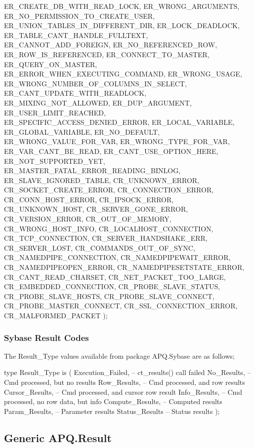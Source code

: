 \documentclass[english,letterpaper]{book}
\begin{document}
\begin{Code}
   ER_CREATE_DB_WITH_READ_LOCK,
   ER_WRONG_ARGUMENTS,
   ER_NO_PERMISSION_TO_CREATE_USER,
   ER_UNION_TABLES_IN_DIFFERENT_DIR,
   ER_LOCK_DEADLOCK,
   ER_TABLE_CANT_HANDLE_FULLTEXT,
   ER_CANNOT_ADD_FOREIGN,
   ER_NO_REFERENCED_ROW,
   ER_ROW_IS_REFERENCED,
   ER_CONNECT_TO_MASTER,
   ER_QUERY_ON_MASTER,
   ER_ERROR_WHEN_EXECUTING_COMMAND,
   ER_WRONG_USAGE,
   ER_WRONG_NUMBER_OF_COLUMNS_IN_SELECT,
   ER_CANT_UPDATE_WITH_READLOCK,
   ER_MIXING_NOT_ALLOWED,
   ER_DUP_ARGUMENT,
   ER_USER_LIMIT_REACHED,
   ER_SPECIFIC_ACCESS_DENIED_ERROR,
   ER_LOCAL_VARIABLE,
   ER_GLOBAL_VARIABLE,
   ER_NO_DEFAULT,
   ER_WRONG_VALUE_FOR_VAR,
   ER_WRONG_TYPE_FOR_VAR,
   ER_VAR_CANT_BE_READ,
   ER_CANT_USE_OPTION_HERE,
   ER_NOT_SUPPORTED_YET,
   ER_MASTER_FATAL_ERROR_READING_BINLOG,
   ER_SLAVE_IGNORED_TABLE,
   CR_UNKNOWN_ERROR,
   CR_SOCKET_CREATE_ERROR,
   CR_CONNECTION_ERROR,
   CR_CONN_HOST_ERROR,
   CR_IPSOCK_ERROR,
   CR_UNKNOWN_HOST,
   CR_SERVER_GONE_ERROR,
   CR_VERSION_ERROR,
   CR_OUT_OF_MEMORY,
   CR_WRONG_HOST_INFO,
   CR_LOCALHOST_CONNECTION,
   CR_TCP_CONNECTION,
   CR_SERVER_HANDSHAKE_ERR,
   CR_SERVER_LOST,
   CR_COMMANDS_OUT_OF_SYNC,
   CR_NAMEDPIPE_CONNECTION,
   CR_NAMEDPIPEWAIT_ERROR,
   CR_NAMEDPIPEOPEN_ERROR,
   CR_NAMEDPIPESETSTATE_ERROR,
   CR_CANT_READ_CHARSET,
   CR_NET_PACKET_TOO_LARGE,
   CR_EMBEDDED_CONNECTION,
   CR_PROBE_SLAVE_STATUS,
   CR_PROBE_SLAVE_HOSTS,
   CR_PROBE_SLAVE_CONNECT,
   CR_PROBE_MASTER_CONNECT,
   CR_SSL_CONNECTION_ERROR,
   CR_MALFORMED_PACKET
);
\end{Code}

\subsubsection{Sybase Result Codes}

The Result\_Type values available from package APQ.Sybase are as follows;

\begin{Code}
type Result_Type is (
   Execution_Failed, -- ct_results() call failed
   No_Results,       -- Cmd processed, but no results
   Row_Results,      -- Cmd processed, and row results
   Cursor_Results,   -- Cmd processed, and cursor row result
   Info_Results,     -- Cmd processed, no row data, but info
   Compute_Results,  -- Computed results
   Param_Results,    -- Parameter results
   Status_Results    -- Status results
);
\end{Code}

\subsection{Generic APQ.Result\label{Generic APQ.Result}}
\end{document}
